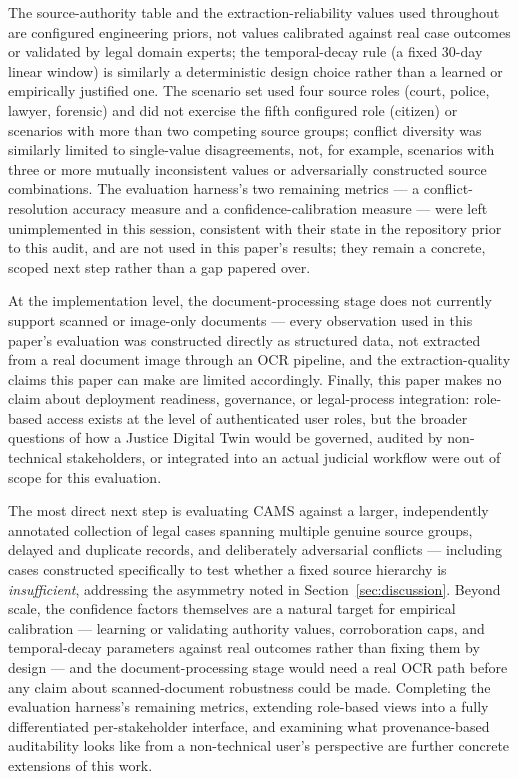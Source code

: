 \documentclass[conference]{IEEEtran}
\begin{document}
The source-authority table and the extraction-reliability values used
throughout are configured engineering priors, not values calibrated against
real case outcomes or validated by legal domain experts; the temporal-decay
rule (a fixed 30-day linear window) is similarly a deterministic design
choice rather than a learned or empirically justified one. The scenario set
used four source roles (court, police, lawyer, forensic) and did not
exercise the fifth configured role (citizen) or scenarios with more than
two competing source groups; conflict diversity was similarly limited to
single-value disagreements, not, for example, scenarios with three or more
mutually inconsistent values or adversarially constructed source
combinations. The evaluation harness's two remaining metrics --- a
conflict-resolution accuracy measure and a confidence-calibration measure
--- were left unimplemented in this session, consistent with their state in
the repository prior to this audit, and are not used in this paper's
results; they remain a concrete, scoped next step rather than a gap papered
over.

At the implementation level, the document-processing stage does not
currently support scanned or image-only documents --- every observation
used in this paper's evaluation was constructed directly as structured
data, not extracted from a real document image through an OCR pipeline, and
the extraction-quality claims this paper can make are limited accordingly.
Finally, this paper makes no claim about deployment readiness, governance,
or legal-process integration: role-based access exists at the level of
authenticated user roles, but the broader questions of how a Justice
Digital Twin would be governed, audited by non-technical stakeholders, or
integrated into an actual judicial workflow were out of scope for this
evaluation.

The most direct next step is evaluating CAMS against a larger,
independently annotated collection of legal cases spanning multiple genuine
source groups, delayed and duplicate records, and deliberately adversarial
conflicts --- including cases constructed specifically to test whether a
fixed source hierarchy is \emph{insufficient}, addressing the asymmetry
noted in Section~\ref{sec:discussion}. Beyond scale, the confidence factors
themselves are a natural target for empirical calibration --- learning or
validating authority values, corroboration caps, and temporal-decay
parameters against real outcomes rather than fixing them by design --- and
the document-processing stage would need a real OCR path before any claim
about scanned-document robustness could be made. Completing the evaluation
harness's remaining metrics, extending role-based views into a fully
differentiated per-stakeholder interface, and examining what
provenance-based auditability looks like from a non-technical user's
perspective are further concrete extensions of this work.
\end{document}
